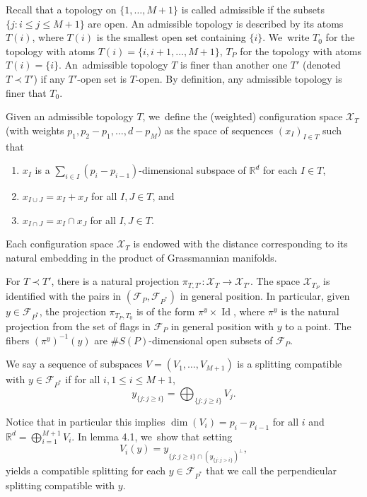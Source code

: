 \documentclass[10pt]{amsart}
\newcommand{\R}{\mathbb{R}}
\newcommand{\F}{\mathcal{F}}
\newcommand{\X}{\mathcal{X}}
\let\x\times
\DeclareMathOperator{\id}{Id}
\begin{document}
Recall that a topology on \(\{ 1,\ldots, M +1\}\) is called admissible if the subsets \hbox{\(\{j: i \le j \le M+1\}\)} are open. An admissible topology is described by its atoms \(T(i)\), where \(T(i)\) is the smallest open set containing \(\{i\} \). We~write \(T_0\) for the topology with atoms \(T(i) =\{ i,i+1, \ldots, M+1\}\), \(T_P\) for the topology with atoms \(T(i) =\{ i\}\). An~admissible topology \(T\) is finer than another one \(T'\) (denoted \(T \prec T'\)) if any \(T' \)-open set is \(T\)-open. By definition, any admissible topology is finer that \(T_0\).

Given an admissible topology \(T\), we~define the (weighted) configuration space \(\X_T\) (with weights \(p_1,p_2-p_1,\ldots,d-p_{M}\)) as the space of sequences \((x_I)_{I \in T}\) such that
\begin{enumerate}
\item \(x_I\) is a \(\sum_{i\in I}(p_i -p_{i-1})\)-dimensional subspace of \(\R^d\) for each \(I \in T\),
\item \(x_{I \cup J} = x_I + x_J\) for all \(I,J \in T\), and
\item \(x_{I\cap J} = x_I \cap x_J\) for all \(I,J \in T\).
\end{enumerate}

Each configuration space \(\X_T\) is endowed with the distance corresponding to its natural embedding in the product of Grassmannian manifolds.

For \(T \prec T'\), there is a natural projection \(\pi_{T,T'} : \X_T \to \X_{T'} \). The space \(\X_{T_P} \) is identified with the pairs in \((\F_{P}, \F_{P^\ast})\) in general position. In particular, given \(y \in \F_{P^\ast} \), the projection \(\pi_{T_P, T_{0}} \) is of the form \(\pi^y \x \id\), where \(\pi^y \) is the natural projection from the set of flags in \(\F_{P}\) in general position with \(y\) to a point. The fibers \((\pi^y)^{-1} (y)\) are \(\# S(P) \)-dimensional open subsets of \(\F_{P}\).

We say a sequence of subspaces \(V = (V_1,\ldots, V_{M+1})\) is a splitting compatible with \(y \in \F_{P^\ast} \) if for all \(i, 1\leq i \leq M+1\),\vspace*{-3pt}
\begin{equation}\label{compatiblesplittingequation}
y_{\{j: j\geq {i}\}} = \bigoplus_{\{j: j\ge i\}}V_j.
\end{equation}

Notice that in particular this implies \(\dim(V_i) = p_i - p_{i-1}\) for all \(i\) and \(\R^d = \bigoplus_{i = 1}^{M+1} V_i\).
In \cite{LL23} lemma 4.1, we~show that setting\vspace*{-3pt}
\begin{equation}\label{perpcompatiblesplitting}
V_i(y) = y_{\{j: j\geq {i}\} \cap \left(y_{\{j: j>i\}} \right)^{\perp}},
\end{equation}
yields a compatible splitting for each \(y \in \F_{P^\ast} \) that we call the perpendicular splitting compatible with \(y\).
\end{document}
